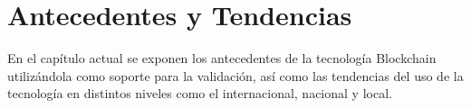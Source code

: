 \chapter{Antecedentes y Tendencias}
En el capítulo actual se exponen los antecedentes de la tecnología  Blockchain utilizándola como soporte para 
la validación, así como las tendencias del uso de la tecnología en distintos niveles como el internacional, nacional y local.




% 
% 
